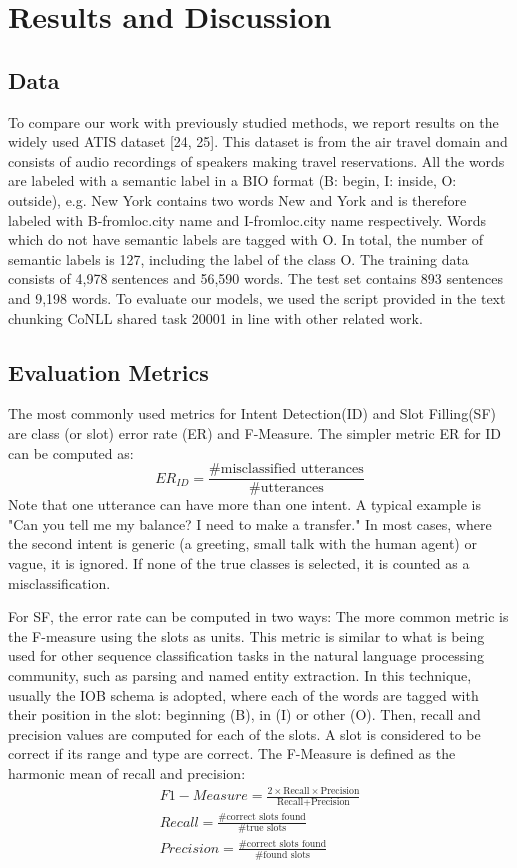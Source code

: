 \chapter{Results and Discussion}

\section{Data}
To compare our work with previously studied methods, we report
results on the widely used ATIS dataset [24, 25]. This
dataset is from the air travel domain and consists of audio
recordings of speakers making travel reservations. All
the words are labeled with a semantic label in a BIO format
(B: begin, I: inside, O: outside), e.g. New York contains
two words New and York and is therefore labeled with
B-fromloc.city name and I-fromloc.city name
respectively. Words which do not have semantic labels are
tagged with O. In total, the number of semantic labels is 127,
including the label of the class O. The training data consists of
4,978 sentences and 56,590 words. The test set contains 893
sentences and 9,198 words. To evaluate our models, we used the
script provided in the text chunking CoNLL shared task 20001
in line with other related work.

\section{Evaluation Metrics}
The most commonly used metrics for Intent Detection(ID) and Slot Filling(SF) are class (or slot)
error rate (ER) and F-Measure. The simpler metric ER for ID can
be computed as:
\begin{equation}
ER_{ID} = \frac{\text{\# misclassified utterances}}{\text{\# utterances}}
\end{equation}
Note that one utterance can have more than one intent. A typical
example is "Can you tell me my balance? I need to make a transfer."
In most cases, where the second intent is generic (a greeting, small
talk with the human agent) or vague, it is ignored. If none of the true
classes is selected, it is counted as a misclassification.
\par
For SF, the error rate can be computed in two ways: The more
common metric is the F-measure using the slots as units. This metric
is similar to what is being used for other sequence classification tasks
in the natural language processing community, such as parsing and
named entity extraction. In this technique, usually the IOB schema
is adopted, where each of the words are tagged with their position in
the slot: beginning (B), in (I) or other (O). Then, recall and precision
values are computed for each of the slots. A slot is considered to be
correct if its range and type are correct. The F-Measure is defined as
the harmonic mean of recall and precision:
\begin{eqnarray}
F1-Measure = \frac{2 \times \text{Recall} \times \text{Precision}}{\text{Recall} + \text{Precision}} \\
Recall = \frac{\text{\# correct slots found}}{\text{\# true slots}} \\
Precision = \frac{\text{\# correct slots found}}{\text{\# found slots}}
\end{eqnarray}


